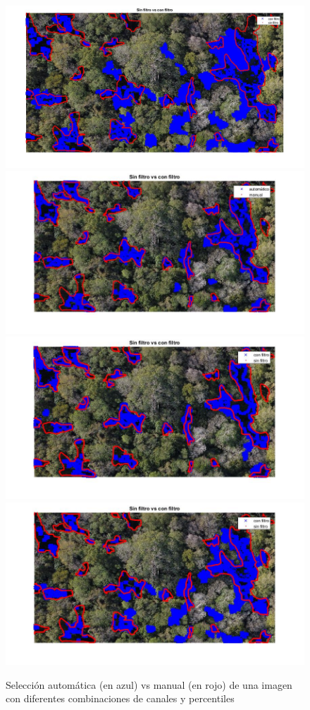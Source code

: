 \begin{figure}
    \includegraphics[width=.3\textwidth]{Imagenes/IIC/p85/GR/280a.jpg}\hfill
    \\[\smallskipamount]
    \includegraphics[width=.3\textwidth]{Imagenes/IIC/p90/BR/280a.jpg}\hfill
    \includegraphics[width=.3\textwidth]{Imagenes/IIC/p90/BG/280a.jpg}\hfill
    \includegraphics[width=.3\textwidth]{Imagenes/IIC/p90/GR/280a.jpg}\hfill
    
    \caption{Selección automática (en azul) vs manual (en rojo) de una imagen con diferentes combinaciones de canales y percentiles}
\end{figure}\label{dji280}


